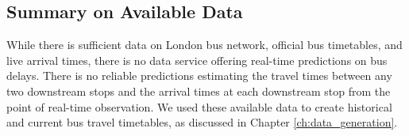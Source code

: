 \subsection{Summary on Available Data}
\par While there is sufficient data on London bus network, official bus timetables, and live arrival times, there is no data service offering real-time predictions on bus delays. There is no reliable predictions estimating the travel times between any two downstream stops and the arrival times at each downstream stop from the point of real-time observation. We used these available data to create historical and current bus travel timetables, as discussed in Chapter \ref{ch:data_generation}.
